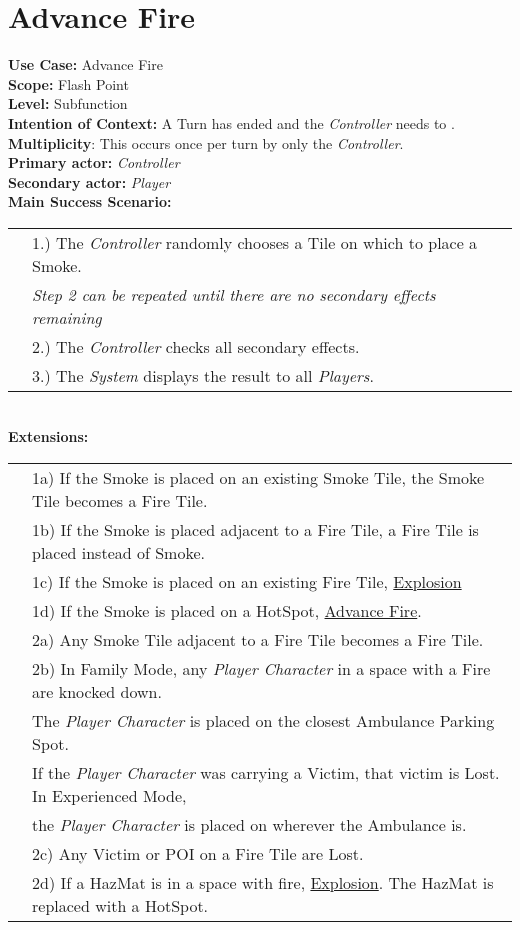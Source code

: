 \documentclass{article}
\begin{document}
	\section*{Advance Fire}
	\textbf{Use Case:} Advance Fire\\
	\textbf{Scope:} Flash Point\\
	\textbf{Level:} Subfunction\\
	\textbf{Intention of Context:} A Turn has ended and the \textit{Controller} needs to .\\
	\textbf{Multiplicity}: This occurs once per turn by only the \textit{Controller}.\\
	\textbf{Primary actor:} \textit{Controller}\\
	\textbf{Secondary actor:} \textit{Player}\\
	\textbf{Main Success Scenario:}\\
	\begin{tabular}{l l}
		&1.) The \textit{Controller} randomly chooses a Tile on which to place a Smoke.\\
		&\textit{Step 2 can be repeated until there are no secondary effects remaining}\\
		&2.) The \textit{Controller} checks all secondary effects.\\
		&3.) The \textit{System} displays the result to all \textit{Players}.
	\end{tabular}\\
	\textbf{Extensions: }\\
	\begin{tabular}{l l}
		&1a) If the Smoke is placed on an existing Smoke Tile, the Smoke Tile becomes a Fire Tile.\\
		&1b) If the Smoke is placed adjacent to a Fire Tile, a Fire Tile is placed instead of Smoke.\\
		&1c) If the Smoke is placed on an existing Fire Tile, \underline{Explosion}\\
		&1d) If the Smoke is placed on a HotSpot, \underline{Advance Fire}.\\
		&2a) Any Smoke Tile adjacent to a Fire Tile becomes a Fire Tile. \\
		&2b) In Family Mode, any \textit{Player Character} in a space with a Fire are knocked down.\\
		&\qquad The \textit{Player Character} is placed on the closest Ambulance Parking Spot.\\
		&\qquad If the \textit{Player Character} was carrying a Victim, that victim is Lost. In Experienced Mode,\\
		&\qquad the \textit{Player Character} is placed on wherever the Ambulance is.\\
		&2c) Any Victim or POI on a Fire Tile are Lost.\\
		&2d) If a HazMat is in a space with fire,  \underline{Explosion}. The HazMat is replaced with a HotSpot.\\
	\end{tabular}
\end{document}
